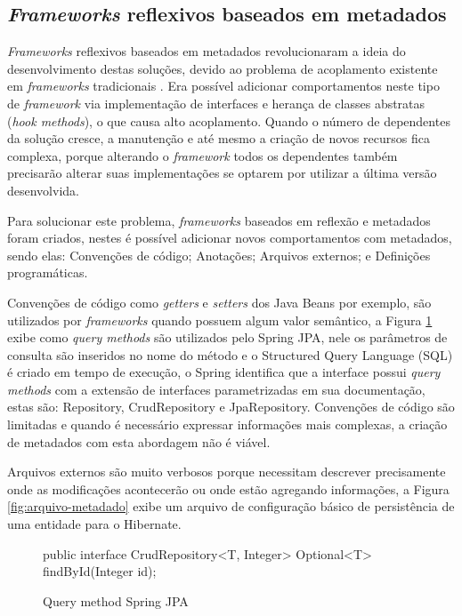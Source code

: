 \subsection{\textit{Frameworks} reflexivos baseados em metadados}

\par \textit{Frameworks} reflexivos baseados em metadados revolucionaram a ideia do desenvolvimento destas soluções, devido ao problema de acoplamento existente em \textit{frameworks} tradicionais \cite{guerra2010conceptual}. Era possível adicionar comportamentos neste tipo de \textit{framework} via implementação de interfaces e herança de classes abstratas (\textit{hook methods}), o que causa alto acoplamento. Quando o número de dependentes da solução cresce, a manutenção e até mesmo a criação de novos recursos fica complexa, porque alterando o \textit{framework} todos os dependentes também precisarão alterar suas implementações se optarem por utilizar a última versão desenvolvida.

\par Para solucionar este problema, \textit{frameworks} baseados em reflexão e metadados foram criados, nestes é possível adicionar novos comportamentos com metadados, sendo elas: Convenções de código; Anotações; Arquivos externos; e Definições programáticas.

\par Convenções de código como \textit{getters} e \textit{setters} dos Java Beans por exemplo, são utilizados por \textit{frameworks} quando possuem algum valor semântico, a Figura \ref{fig:spring-qyery-method} exibe como \textit{query methods} são utilizados pelo Spring JPA, nele os parâmetros de consulta são inseridos no nome do método e o Structured Query Language (SQL) é criado em tempo de execução, o Spring identifica que a interface possui \textit{query methods} com a extensão de interfaces parametrizadas em sua documentação, estas são: Repository, CrudRepository e JpaRepository. Convenções de código são limitadas e quando é necessário expressar informações mais complexas, a criação de metadados com esta abordagem não é viável.

\par Arquivos externos são muito verbosos porque necessitam descrever precisamente onde as modificações acontecerão ou onde estão agregando informações, a Figura \ref{fig:arquivo-metadado} exibe um arquivo de configuração básico de persistência de uma entidade para o Hibernate.

\begin{figure}[H]
    \centering
    \caption{Query method Spring JPA}
    \begin{java}
public interface CrudRepository<T, Integer> {
    Optional<T> findById(Integer id);
}
    \end{java}
    \label{fig:spring-qyery-method}
\end{figure}


